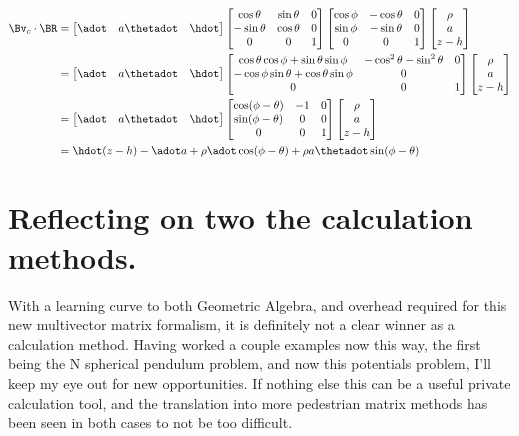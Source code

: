 \begin{align*}
\Bv_c \cdot \BR 
&=
\begin{bmatrix}
\adot & a \thetadot  & \hdot 
\end{bmatrix}
\begin{bmatrix}
\cos\theta & \sin\theta & 0 \\
-\sin\theta & \cos\theta & 0 \\
0 & 0 & 1
\end{bmatrix}
\begin{bmatrix}
\cos\phi & - \cos\theta & 0 \\
\sin\phi & - \sin\theta & 0 \\
0 & 0 & 1 
\end{bmatrix}
\begin{bmatrix}
\rho \\
a \\
z - h
\end{bmatrix} \\
&=
\begin{bmatrix}
\adot & a \thetadot  & \hdot 
\end{bmatrix}
\begin{bmatrix}
\cos\theta \cos\phi + \sin\theta \sin\phi & -\cos^2 \theta - \sin^2 \theta & 0 \\
-\cos\phi \sin\theta + \cos\theta \sin\phi & 0 \\
0 & 0 & 1
\end{bmatrix}
\begin{bmatrix}
\rho \\
a \\
z - h
\end{bmatrix} \\
&=
\begin{bmatrix}
\adot & a \thetadot  & \hdot 
\end{bmatrix}
\begin{bmatrix}
\cos(\phi - \theta) & -1 & 0 \\
\sin(\phi - \theta) & 0 & 0 \\
0 & 0 & 1
\end{bmatrix}
\begin{bmatrix}
\rho \\
a \\
z - h
\end{bmatrix} \\
&=
\hdot(z - h) - \adot a + \rho \adot \cos(\phi - \theta) + \rho a \thetadot \sin(\phi - \theta)
\end{align*}

\section{Reflecting on two the calculation methods.}

With a learning curve to both Geometric Algebra, and overhead required for this new multivector matrix formalism, it is definitely not a clear winner as a calculation method.  Having worked a couple examples now this way, the first being the N spherical pendulum problem, and now this potentials problem, I'll keep my eye out for new opportunities.  If nothing else this can be a useful private calculation tool, and the translation into more pedestrian matrix methods has been seen in both cases to not be too difficult.

\EndArticle
